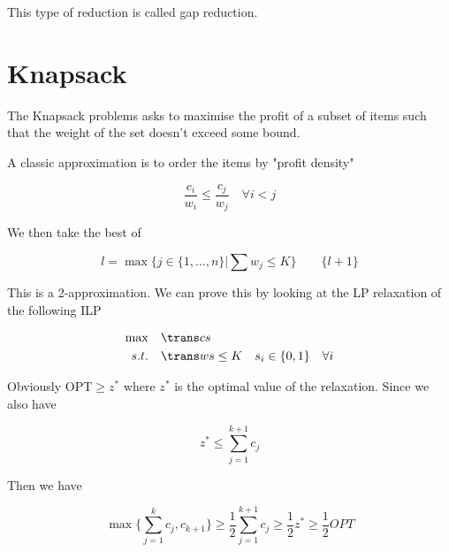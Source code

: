 This type of reduction is called gap reduction.

\section{Knapsack}

The Knapsack problems asks to maximise the profit of a subset of items such that the weight of the set doesn't exceed some bound.

A classic approximation is to order the items by "profit density"

\[\frac{c_i}{w_i} \leq \frac{c_j}{w_j} \quad \forall i<j\]

We then take the best of

\[l = \max \{j\in \{1,\ldots, n\}| \sum w_j \leq K\} \qquad \{l+1\}\]

This is a 2-approximation. We can prove this by looking at the LP relaxation of the following ILP

\begin{align*}
\max \quad & \trans c s\\
s.t.\quad & \trans w s \leq K
	& s_i \in \{0,1\} && \forall i
\end{align*}

Obviously OPT$\geq z^*$ where $z^*$ is the optimal value of the relaxation. Since we also have

\[z^* \leq \sum_{j=1}^{k+1} c_j\]

Then we have

\[\max \{\sum_{j=1}^k c_j, c_{k+1}\} \geq \frac 12 \sum_{j=1}^{k+1} c_j \geq \frac 12 z^* \geq \frac 12 OPT\]